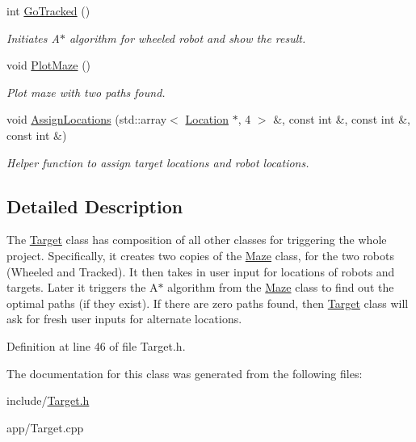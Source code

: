 \begin{DoxyCompactItemize}
\mbox{\label{class_target_a318232053512e25d6f1019cc88f5d6d8}} 
int \mbox{\hyperlink{class_target_a318232053512e25d6f1019cc88f5d6d8}{Go\+Tracked}} ()
\begin{DoxyCompactList}\small\item\em Initiates A$\ast$ algorithm for wheeled robot and show the result. \end{DoxyCompactList}\item 
\mbox{\label{class_target_a3d2cf10509fc6e109b4fc45b580d7671}} 
void \mbox{\hyperlink{class_target_a3d2cf10509fc6e109b4fc45b580d7671}{Plot\+Maze}} ()
\begin{DoxyCompactList}\small\item\em Plot maze with two paths found. \end{DoxyCompactList}\item 
\mbox{\label{class_target_a51f58de7a9d5a67dac0172480f4a1dae}} 
void \mbox{\hyperlink{class_target_a51f58de7a9d5a67dac0172480f4a1dae}{Assign\+Locations}} (std\+::array$<$ \mbox{\hyperlink{struct_location}{Location}} $\ast$, 4 $>$ \&, const int \&, const int \&, const int \&)
\begin{DoxyCompactList}\small\item\em Helper function to assign target locations and robot locations. \end{DoxyCompactList}\end{DoxyCompactItemize}


\subsection{Detailed Description}
The \mbox{\hyperlink{class_target}{Target}} class has composition of all other classes for triggering the whole project. Specifically, it creates two copies of the \mbox{\hyperlink{class_maze}{Maze}} class, for the two robots (Wheeled and Tracked). It then takes in user input for locations of robots and targets. Later it triggers the A$\ast$ algorithm from the \mbox{\hyperlink{class_maze}{Maze}} class to find out the optimal paths (if they exist). If there are zero paths found, then \mbox{\hyperlink{class_target}{Target}} class will ask for fresh user inputs for alternate locations. 

Definition at line 46 of file Target.\+h.



The documentation for this class was generated from the following files\+:\begin{DoxyCompactItemize}
\item 
include/\mbox{\hyperlink{_target_8h}{Target.\+h}}\item 
app/Target.\+cpp\end{DoxyCompactItemize}
